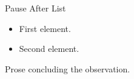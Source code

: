 \documentclass[14pt,t]{beamer-accessibility}
\begin{document}
\begin{frame}{Pause After List}
\begin{itemize}
\item First element.
\item Second element.
\end{itemize}
\pause
Prose concluding the observation.
\end{frame}
\end{document}
